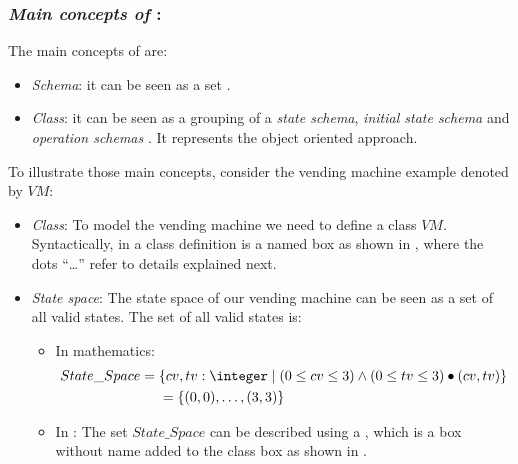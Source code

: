 \subsubsection{\textit{Main concepts of \oz{}}:} 
\label{main_concepts_oz} 
The main concepts of \oz{} are:
\begin{itemize}
\item \textit{Schema}: it can be seen as a set \cite{woodcock}.
\item \textit{Class}: it can be seen as a grouping of a \textit{state schema}, \textit{initial state schema} and \textit{operation schemas} \cite{kenji}. It represents the object oriented approach.
\end{itemize}
To illustrate those main concepts, consider the vending machine example denoted by $VM$:
\begin{itemize}
\item \textit{Class}: To model the vending machine we need to define a class $VM$. Syntactically, in \oz{}
a class definition is a named box as shown in , where the dots ``\dots'' refer to details explained next.


\item \textit{State space}: The state space of our vending machine can be seen as a set of all valid states. The set of all valid states is:
\begin{itemize}
\item In mathematics:
\begin{equation*}
\begin{aligned}
State\_Space ={} & \{cv,tv: \integer\mid (0 \leq  cv \leq 3) \wedge
(0 \leq  tv \leq 3)\bullet(cv,tv)\}\\
      & =\{\pair{0}{0},\dots,\pair{3}{3}\}
\end{aligned}
\end{equation*}
\item In \oz{}: The set $State\_Space$ can be described using a , which is a box without name added to the class box as shown in .
\end{itemize}



\end{itemize}
